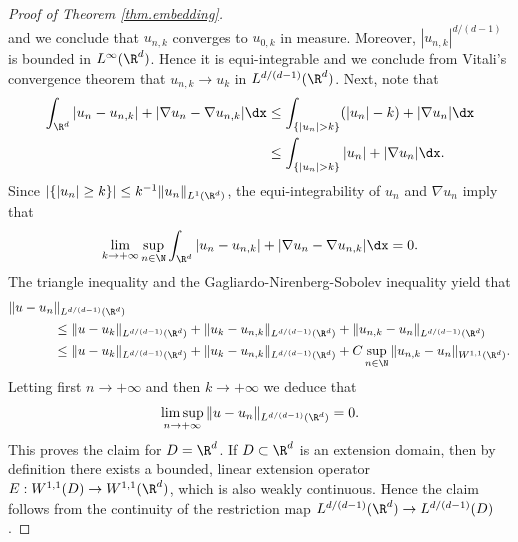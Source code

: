 \begin{proof}[Proof of Theorem \ref{thm.embedding}]
\begin{equation*}
\end{equation*}
and we conclude that $u_{n,k}$ converges to $u_{0,k}$ in measure. Moreover, $|u_{n,k}|^{d/(d-1)}$ is bounded in $L^{\infty}(\R^d)$. Hence it is equi-integrable and we conclude from Vitali's convergence theorem \cite[Th.\,2.24]{FoLe} that $u_{n,k}\to u_k$ in $L^{d/(d-1)}(\R^d)$. Next, note that\vspace*{-3pt}
\begin{align*}
\int_{\R^d}|u_n-u_{n,k}|+|\nabla u_n-\nabla u_{n,k}|\dx&\leq \int_{\{|u_n|> k\}}(|u_n|-k)+|\nabla u_n|\dx
\\
&\leq \int_{\{|u_n|> k\}}|u_n|+|\nabla u_n|\dx.
\end{align*}
Since $|\{|u_n|\geq k\}|\leq k^{-1}\|u_n\|_{L^1(\R^d)}$, the equi-integrability of $u_n$ and $\nabla u_n$ imply that\vspace*{-3pt}
\begin{equation*}
\lim_{k\to +\infty}\sup_{n\in\N}\int_{\R^d}|u_n-u_{n,k}|+|\nabla u_n-\nabla u_{n,k}|\dx=0.
\end{equation*}
The triangle inequality and the Gagliardo-Nirenberg-Sobolev inequality yield that\vspace*{-3pt}
\begin{align*}
\|u-u_n&\|_{L^{d/(d-1)}(\R^d)}\\
&\leq\|u-u_{k}\|_{L^{d/(d-1)}(\R^d)}+\|u_k-u_{n,k}\|_{L^{d/(d-1)}(\R^d)}
+\|u_{n,k}-u_{n}\|_{L^{d/(d-1)}(\R^d)}
\\
&\leq \|u-u_{k}\|_{L^{d/(d-1)}(\R^d)}+\|u_k-u_{n,k}\|_{L^{d/(d-1)}(\R^d)}
+C\sup_{n\in\N}\|u_{n,k}-u_{n}\|_{W^{1,1}(\R^d)}.
\end{align*}
Letting first $n\to +\infty$ and then $k\to +\infty$ we deduce that\vspace*{-3pt}
\begin{equation*}
\limsup_{n\to +\infty}\|u-u_n\|_{L^{d/(d-1)}(\R^d)}=0.
\end{equation*}
This proves the claim for $D=\R^d$. If $D\subset\R^d$ is an extension domain, then by definition there exists a bounded, linear extension operator $E:W^{1,1}(D)\to W^{1,1}(\R^d)$, which is also weakly continuous. Hence the claim follows from the continuity of the restriction map $L^{d/(d-1)}(\R^d)\to L^{d/(d-1)}(D)$.
\end{proof}

